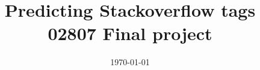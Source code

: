 \documentclass[a4paper]{article}
\numberwithin{equation}{section}
\begin{document}
\title{Predicting Stackoverflow tags \\ 02807 Final project}
\date{\today}

\maketitle












\pagebreak
\appendix


\pagebreak
\printbibliography
\end{document}

